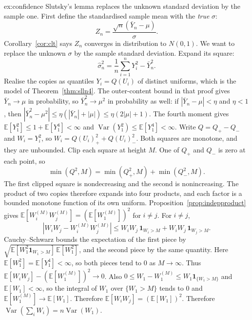\begin{solution}{ex:confidence}
\idea Slutsky's lemma replaces the unknown standard deviation by the sample one.
\writeup First define the standardised sample mean with the \emph{true} $\sigma$:
\[
 Z_n=\frac{\sqrt n(\bar Y_n-\mu)}{\sigma}.
\]
Corollary~\ref{cor:clt} says $Z_n$ converges in distribution to $N(0,1)$. We want to replace the unknown $\sigma$ by the sample standard deviation. Expand its square:
\[
 \hat\sigma_n^2=\frac1n\sum_{i=1}^n Y_i^2-\bar Y_n^2.
\]
Realise the copies as quantiles $Y_i=Q(U_i)$ of distinct uniforms, which is the model of Theorem~\ref{thm:slln4}. The outer-content bound in that proof gives $\bar Y_n\to\mu$ in probability, so $\bar Y_n^2\to\mu^2$ in probability as well: if $| \bar Y_n-\mu|<\eta$ and $\eta<1$, then $|\bar Y_n^2-\mu^2|\le\eta(|\bar Y_n|+|\mu|)\le\eta(2|\mu|+1)$. The fourth moment gives $\mathbb E[Y_1^2]\le 1+\mathbb E[Y_1^4]<\infty$ and $\operatorname{Var}(Y_1^2)\le\mathbb E[Y_1^4]<\infty$. Write $Q=Q_+-Q_-$ and $W_i=Y_i^2$, so $W_i=Q(U_i)_+^2+Q(U_i)_-^2$. Both squares are monotone, and they are unbounded. Clip each square at height $M$. One of $Q_+$ and $Q_-$ is zero at each point, so
\[
 \min(Q^2,M)=\min(Q_+^2,M)+\min(Q_-^2,M).
\]
The first clipped square is nondecreasing and the second is nonincreasing. The product of two copies therefore expands into four products, and each factor is a bounded monotone function of its own uniform. Proposition~\ref{prop:indepproduct} gives $\mathbb E[W_i^{(M)}W_j^{(M)}]=(\mathbb E[W_1^{(M)}])^2$ for $i\ne j$. For $i\ne j$,
\[
 |W_i W_j-W_i^{(M)}W_j^{(M)}|
 \le W_i W_j\,\mathbf 1_{W_i>M}+W_i W_j\,\mathbf 1_{W_j>M}.
\]
Cauchy--Schwarz bounds the expectation of the first piece by $\sqrt{\mathbb E[W_1^2\mathbf 1_{W_1>M}]\,\mathbb E[W_1^2]}$, and the second piece by the same quantity. Here $\mathbb E[W_1^2]=\mathbb E[Y_1^4]<\infty$, so both pieces tend to $0$ as $M\to\infty$. Thus $\mathbb E[W_i W_j]-(\mathbb E[W_1^{(M)}])^2\to0$. Also $0\le W_1-W_1^{(M)}\le W_1\mathbf 1_{\{W_1>M\}}$ and $\mathbb E[W_1]<\infty$, so the integral of $W_1$ over $\{W_1>M\}$ tends to $0$ and $\mathbb E[W_1^{(M)}]\to\mathbb E[W_1]$. Therefore $\mathbb E[W_iW_j]=(\mathbb E[W_1])^2$. Therefore $\operatorname{Var}(\sum_i W_i)=n\operatorname{Var}(W_1)$.


\end{solution}
